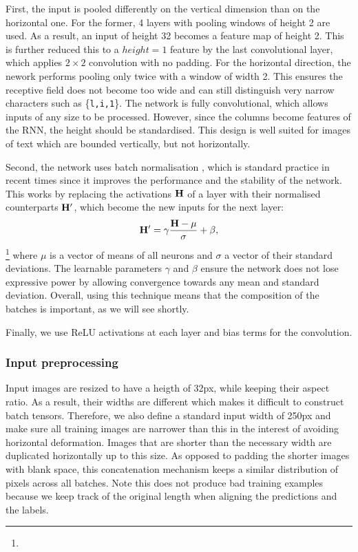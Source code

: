 		First, the input is pooled differently on the vertical dimension than on the horizontal one. For the former, 4 layers with pooling windows of height 2 are used. As a result, an input of height 32 becomes a feature map of height 2. This is further reduced this to a \(\mathit{height} = 1\) feature by the last convolutional layer, which applies \(2 \times 2\) convolution with no padding. For the horizontal direction, the nework performs pooling only twice with a window of width 2. This ensures the receptive field does not become too wide and can still distinguish very narrow characters such as \{\texttt{l,i,1}\}. The network is fully convolutional, which allows inputs of any size to be processed. However, since the columns become features of the RNN, the height should be standardised. This design is well suited for images of text which are bounded vertically, but not horizontally.

		Second, the network uses batch normalisation \citep{batch_norm}, which is standard practice in recent times since it improves the performance and the stability of the network. This works by replacing the activations \(\mathbf{H}\) of a layer with their normalised counterparts \(\mathbf{H}'\), which become the new inputs for the next layer: \[
			\mathbf{H}' = \gamma \frac{\mathbf{H} - \mathbf{\mu}}{\mathbf{\sigma}} + \beta,
		\]\footnote{} where \(\mu\) is a vector of means of all neurons and \(\sigma\) a vector of their standard deviations. The learnable parameters \(\gamma\) and \(\beta\) ensure the network does not lose expressive power by allowing convergence towards any mean and standard deviation. Overall, using this technique means that the composition of the batches is important, as we will see shortly.

		Finally, we use ReLU activations at each layer and bias terms for the convolution.

		\subsubsection*{Input preprocessing}

			Input images are resized to have a heigth of 32px, while keeping their aspect ratio. As a result, their widths are different which makes it difficult to construct batch tensors. Therefore, we also define a standard input width of 250px and make sure all training images are narrower than this in the interest of avoiding horizontal deformation. Images that are shorter than the necessary width are duplicated horizontally up to this size. As opposed to padding the shorter images with blank space, this concatenation mechanism keeps a similar distribution of pixels across all batches. Note this does not produce bad training examples because we keep track of the original length when aligning the predictions and the labels.

